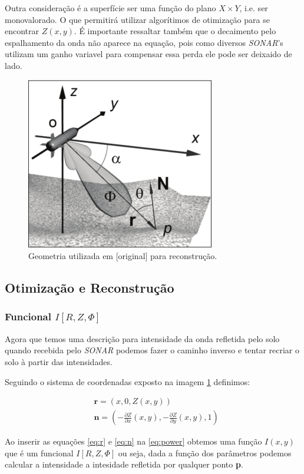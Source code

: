 \documentclass[a4paper,11pt,oneside,brazilian]{article}
\newcommand{\cpar}[2]{\frac{\partial #1}{\partial #2}}
\begin{document}
Outra consideração é a superfície ser uma função do plano \(X \times
Y\), i.e. ser monovalorado. O que permitirá utilizar algorítimos de otimização
para se encontrar \(Z(x,y)\). É importante ressaltar também que o decaimento
pelo espalhamento da onda não aparece na equação, pois como diversos \emph{SONAR}'s
utilizam um ganho variavel para compensar essa perda ele pode ser deixaido de
lado.

 \begin{figure}[ht]
    \centering
    \includegraphics[width=0.4\columnwidth]{sides_geo.png}
    \caption{Geometria utilizada em [original] para reconstrução.} 
    \label{fig:sidesgeo}
\end{figure}

\subsection{Otimização e Reconstrução}
\subsubsection{Funcional \(I[R,Z,\Phi]\)}
Agora que temos uma descrição para intensidade da onda refletida pelo solo
quando recebida pelo \emph{SONAR} podemos fazer o caminho inverso e tentar
recriar o solo à partir das intensidades.

Seguindo o sistema de coordenadas exposto na imagem \ref{fig:sidesgeo}
definimos:

\begin{align}
&\textbf{r} = (x,0,Z(x,y)) \label{eq:r} \\ 
&\textbf{n} = \left ( -\cpar{Z}{x}(x,y), - \cpar{Z}{y}(x,y),1 \right )
\label{eq:n}
\end{align}

Ao inserir as equações \eqref{eq:r} e \eqref{eq:n} na \eqref{eq:power} obtemos
uma função \(I(x,y)\) que é um funcional \(I[R,Z,\Phi]\) ou seja, dada a função
dos parâmetros podemos calcular a intensidade a intesidade refletida por
qualquer ponto \textbf{p}.
\end{document}
